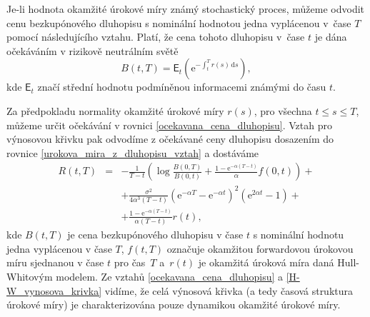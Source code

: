 \documentclass[a4paper,12pt]{report}
\theoremstyle{definition} \newtheorem{definice}[veta]{Definice}
\theoremstyle{remark}
\begin{document}
Je-li hodnota okamžité úrokové míry známý stochastický proces, můžeme odvodit cenu bezkupónového dluhopisu s nominální hodnotou jedna vyplácenou v~čase $T$ pomocí následujícího vztahu.
Platí, že cena tohoto dluhopisu v~čase $t$ je dána očekáváním v rizikově neutrálním světě %
\begin{equation}\label{ocekavana_cena_dluhopisu}
B(t,T)=\mathsf{E}_t\left(\mathrm{e}^{-\int_{t}^T r(s)\,\mathrm{d}s}\right),
\end{equation}
kde $\mathsf{E}_t$ značí střední hodnotu podmíněnou informacemi známými do času $t$.

Za předpokladu normality okamžité úrokové míry $r(s)$, pro všechna $t\leq s\leq T$, můžeme určit očekávání v rovnici \eqref{ocekavana_cena_dluhopisu}.
Vztah pro výnosovou křivku pak odvodíme z očekávané ceny dluhopisu dosazením do rovnice \eqref{urokova_mira_z_dluhopisu_vztah} a dostáváme
\begin{eqnarray}\label{H-W_vynosova_krivka}
R(t,T)&=&-\frac{1}{T-t}\left(\log \frac{B(0,T)}{B(0,t)}+\frac{1-\mathrm{e}^{-\alpha(T-t)}}{\alpha}f(0,t)\right)+ \nonumber\\
&&+\frac{\sigma^2}{4\alpha^3(T-t)}\left(\mathrm{e}^{-\alpha T}-\mathrm{e}^{-\alpha t}\right)^2\left(\mathrm{e}^{2\alpha t}-1\right)+  \nonumber\\
&&+\frac{1-\mathrm{e}^{-\alpha(T-t)}}{\alpha(T-t)}r(t),
\end{eqnarray}
kde $B(t,T)$ je cena bezkupónového dluhopisu v čase $t$ %
s nominální hodnotu jedna vyplácenou v čase $T$,
$f(t,T)$ označuje okamžitou forwardovou úrokovou míru sjednanou v čase $t$ pro čas~$T$ 
a~$r(t)$ je okamžitá úroková míra daná Hull-Whitovým modelem.
Ze vztahů \eqref{ocekavana_cena_dluhopisu} a \eqref{H-W_vynosova_krivka} vidíme, že celá výnosová křivka (a tedy časová struktura úrokové míry) je charakterizována pouze dynamikou okamžité úrokové míry.

\end{document}
